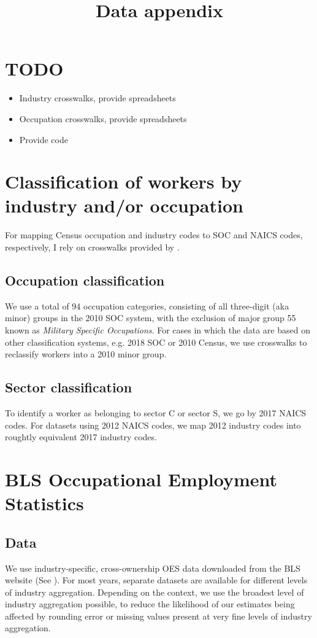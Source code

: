 \documentclass{article}
\title{Data appendix}
\author{}
\date{}
\begin{document}
\maketitle

\section{TODO}
\begin{itemize}
\item Industry crosswalks, provide spreadsheets
\item Occupation crosswalks, provide spreadsheets
\item Provide code
\end{itemize}

\section{Classification of workers by industry and/or occupation}
For mapping Census occupation and industry codes to SOC and NAICS codes, respectively, I rely on crosswalks provided by \cite{crosswalks}.

\subsection{Occupation classification}
We use a total of 94 occupation categories, consisting of all three-digit (aka minor) groups in the 2010 SOC system, with the exclusion of major group 55 known as \emph{Military Specific Occupations}. For cases in which the data are based on other classification systems, e.g. 2018 SOC or 2010 Census, we use crosswalks to reclassify workers into a 2010 minor group.

\subsection{Sector classification}
To identify a worker as belonging to sector C or sector S, we go by 2017 NAICS codes. For datasets using 2012 NAICS codes, we map 2012 industry codes into roughtly equivalent 2017 industry codes.

\section{BLS Occupational Employment Statistics}
\subsection{Data}
We use industry-specific, cross-ownership OES data downloaded from the BLS website (See \cite{OES}). For most years, separate datasets are available for different levels of industry aggregation. Depending on the context, we use the broadest level of industry aggregation possible, to reduce the likelihood of our estimates being affected by rounding error or missing values present at very fine levels of industry aggregation. 
\end{document}
